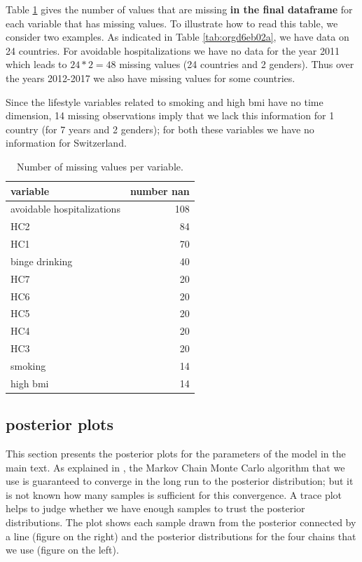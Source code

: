 \documentclass{article}
\begin{document}
Table \ref{tab:org98033cc} gives the number of values that are missing \textbf{in the final dataframe} for each variable that has missing values. To illustrate how to read this table, we consider two examples. As indicated in Table \ref{tab:orgd6eb02a}, we have data on 24 countries. For avoidable hospitalizations we have no data for the year 2011 which leads to \(24*2 = 48\) missing values (24 countries and 2 genders). Thus over the years 2012-2017 we also have missing values for some countries.

Since the lifestyle variables related to smoking and high bmi have no time dimension, 14 missing observations imply that we lack this information for 1 country (for 7 years and 2 genders); for both these variables we have no information for Switzerland.

\begin{table}[htbp]
\caption{\label{tab:org98033cc}Number of missing values per variable.}
\centering
\begin{tabular}{lr}
variable & number nan\\
\hline
avoidable hospitalizations & 108\\
HC2 & 84\\
HC1 & 70\\
binge drinking & 40\\
HC7 & 20\\
HC6 & 20\\
HC5 & 20\\
HC4 & 20\\
HC3 & 20\\
smoking & 14\\
high bmi & 14\\
\end{tabular}
\end{table}

\subsection{posterior plots}
\label{sec:org2c6fc8d}

This section presents the posterior plots for the parameters of the model in the main text. As explained in \cite{mcelreath}, the Markov Chain Monte Carlo algorithm that we use is guaranteed to converge in the long run to the posterior distribution; but it is not known how many samples is sufficient for this convergence. A trace plot helps to judge whether we have enough samples to trust the posterior distributions. The plot shows each sample drawn from the posterior connected by a line (figure on the right) and the posterior distributions for the four chains that we use (figure on the left).
\end{document}
